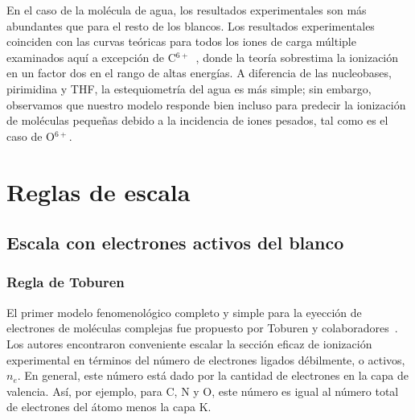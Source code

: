 En el caso de la molécula de agua, los resultados experimentales son más 
abundantes que para el resto de los blancos. Los resultados 
experimentales~\cite{Luna2007,Bolorizadeh86,H_Rudd85,Ohsawa05,He_Rudd85,
toburen80,Bhattacharjee:16} coinciden con las curvas teóricas para 
todos los iones de carga múltiple examinados aquí a excepción de
C$^{6+}$~\cite{DalCappello:09,Bhattacharjee:17}, donde la teoría 
sobrestima la ionización en un factor dos en el rango de altas energías. 
A diferencia de las nucleobases, pirimidina y THF, la estequiometría del 
agua es más simple; sin embargo, observamos que nuestro modelo responde 
bien incluso para predecir la ionización de moléculas pequeñas debido a 
la incidencia de iones pesados, tal como es el caso de O$^{6+}$.

\section{Reglas de escala}
\label{sec:scaling}

\subsection{Escala con electrones activos del blanco}
\label{subsec:ne_scaling}

\subsubsection{Regla de Toburen}
\label{subsec:toburen}

El primer modelo fenomenológico completo y simple para la eyección de 
electrones de moléculas complejas fue propuesto por Toburen y 
colaboradores~\cite{Toburen:75,Toburen:76}. Los autores encontraron 
conveniente escalar la sección eficaz de ionización experimental en 
términos del número de electrones ligados débilmente, o activos, $n_e$. 
En general, este número está dado por la cantidad de electrones en la 
capa de valencia. Así, por ejemplo, para C, N y O, este número es igual 
al número total de electrones del átomo menos la capa K. 

